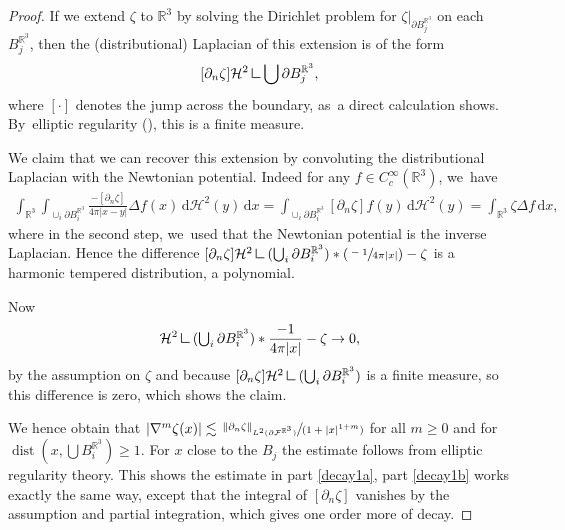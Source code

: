 \documentclass[10pt]{amsart}
\let\ts\textstyle
\newcommand{\Psfrac}[2]{(\sfrac{#1}{#2})}
\newcommand{\spfrac}[2]{\sfrac{#1}{(#2)}}
\theoremstyle{definition}
\DeclareMathOperator{\dist}{dist}
\newcommand\R{\mathbb{R}}
\newcommand\norm[1]{\left\lVert #1\right\rVert}
\newcommand\eq{=}
\newcommand\dd{\,\mathrm{d}}
\newcommand\dx{\dd x}
\newcommand{\mres}{\mathbin{\vrule height 1.6ex depth 0pt width
0.13ex\vrule height 0.13ex depth 0pt width 1.3ex}}
\let\de\partial
\begin{document}
\begin{proof}
If we extend $\zeta$ to $\R^3$ by solving the Dirichlet problem for $\zeta|_{\de B_j^{\R^3}}$ on each~$B_j^{\R^3}$, then the (distributional) Laplacian of this extension is of the form
\[
[\de_n\zeta]\mathcal{H}^2\mres{ \bigcup \de B_j^{\R^3}},
\]
 where $[\cdot]$ denotes the jump across the boundary, as~a direct calculation shows. By~elliptic regularity (\cf \cite[Chap.\,2]{grisvard2011elliptic}), this is a finite measure.

We claim that we can recover this extension by convoluting the distributional Laplacian with the Newtonian potential. Indeed for any $f\in C_c^\infty(\R^3)$, we~have
\begin{align*}
\int_{\R^3}\int_{\cup_i\de B_i^{\R^3}}\frac{-[\de_n\zeta]}{4\pi|x-y|}\Delta f(x)\,\text{d}\mathcal{H}^2(y)\dx\eq\int_{\cup_i\de B_i^{\R^3}}[\de_n\zeta]f(y)\,\text{d}\mathcal{H}^2(y)\eq \int_{\R^3}\zeta \Delta f\dx,
\end{align*}
where in the second step, we~used that the Newtonian potential is the inverse Laplacian. Hence the difference $[\de_n\zeta]\mathcal{H}^2\mres(\bigcup_i\de B_i^{\R^3})*\Psfrac{-1}{4\pi|x|}-\zeta$ is a harmonic tempered distribution, \ie a polynomial.

Now
\begin{align*}
[\de_n\zeta]\mathcal{H}^2\mres({\ts\bigcup_i\de B_i^{\R^3}})*\frac{-1}{4\pi|x|}-\zeta\to 0,
\end{align*}
by the assumption on $\zeta$ and because $[\de_n\zeta]\mathcal{H}^2\mres(\bigcup_i\de B_i^{\R^3})$ is a finite measure, so this difference is zero, which shows the claim.

We hence obtain that $|\nabla^m\zeta(x)|\lesssim\spfrac{\norm{\de_n\zeta}_{L^2(\de\mathcal{F}^{\R^3})}}{1+|x|^{1+m}}$ for all $m\geq0$ and for $\dist(x,\bigcup B_i^{\R^3})\geq 1$. For $x$ close to the $B_j$ the estimate follows from elliptic regularity theory. This shows the estimate in part \eqref{decay1a}, part \eqref{decay1b} works exactly the same way, except that the integral of $[\de_n\zeta]$ vanishes by the assumption and partial integration, which gives one order more of decay.


\end{proof}
\end{document}
